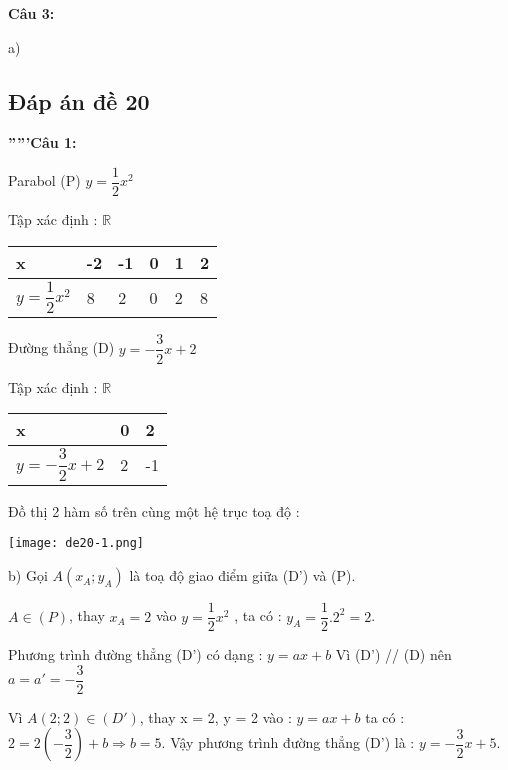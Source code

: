 \documentclass[12pt]{article}
\begin{document}
\textbf{Câu 3:} \par

\newline a) 

\break

\subsection{Đáp án đề 20}

\textbf{'''''Câu 1:} \par

\begin{multicols}{2}
Parabol (P) $y = \dfrac{1}{2}x^2$ \par
Tập xác định : $\mathbb R$ \par
\begin{center}
\begin{tabular}{ | m{1.5cm} | m{0.5cm}| m{0.5cm} | m{0.5cm} | m{0.5cm} | m{0.5cm} |} 
\hline
x & -2 & -1 & 0 & 1 & 2 \\ 
\hline
$y = \dfrac{1}{2}x^2$  & 8 & 2 & 0 & 2 & 8 \\ 
\hline
\end{tabular}
\end{center}

\columnbreak
Đường thẳng (D) $y = -\dfrac{3}{2}x + 2$ \par
Tập xác định : $\mathbb R$ \par
\begin{center}
\begin{tabular}{ | m{2.5cm} | m{0.5cm}| m{0.5cm} |} 
\hline
x & 0 &  2\\ 
\hline
$y = -\dfrac{3}{2}x + 2$ & 2 & -1 \\ 
\hline
\end{tabular}
\end{center}
\end{multicols}
Đồ thị 2 hàm số trên cùng một hệ trục toạ độ : \par

\begin{center}
    \texttt{[image: de20-1.png]}
\end{center}

b) Gọi $A(x_A; y_A)$ là toạ độ giao điểm giữa (D') và (P). \par
$A \in (P)$, thay $x_A = 2$ vào $y = \dfrac{1}{2}x^2$ , ta có : $y_A = \dfrac{1}{2}.2^2 = 2$. \par
Phương trình đường thẳng (D') có dạng : $y = ax + b$ 
Vì (D') // (D) nên $a = a' = -\dfrac{3}{2}$ \par
Vì $A(2; 2) \in (D')$, thay x = 2, y = 2 vào : $y = ax + b$ ta có : $2 = 2(-\dfrac{3}{2}) + b \Rightarrow b = 5$. Vậy phương trình đường thẳng (D') là : $y = -\dfrac{3}{2}x + 5$.
\end{document}
